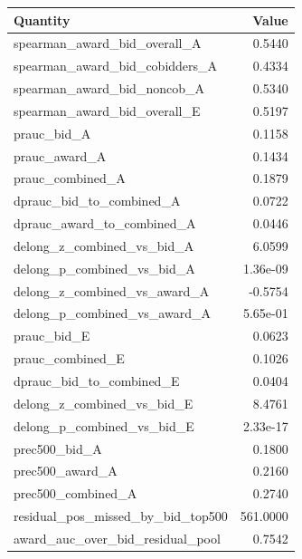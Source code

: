 \begin{tabular}{lr}
\toprule
Quantity & Value \\
\midrule
spearman\_award\_bid\_overall\_A & 0.5440 \\
spearman\_award\_bid\_cobidders\_A & 0.4334 \\
spearman\_award\_bid\_noncob\_A & 0.5340 \\
spearman\_award\_bid\_overall\_E & 0.5197 \\
prauc\_bid\_A & 0.1158 \\
prauc\_award\_A & 0.1434 \\
prauc\_combined\_A & 0.1879 \\
dprauc\_bid\_to\_combined\_A & 0.0722 \\
dprauc\_award\_to\_combined\_A & 0.0446 \\
delong\_z\_combined\_vs\_bid\_A & 6.0599 \\
delong\_p\_combined\_vs\_bid\_A & 1.36e-09 \\
delong\_z\_combined\_vs\_award\_A & -0.5754 \\
delong\_p\_combined\_vs\_award\_A & 5.65e-01 \\
prauc\_bid\_E & 0.0623 \\
prauc\_combined\_E & 0.1026 \\
dprauc\_bid\_to\_combined\_E & 0.0404 \\
delong\_z\_combined\_vs\_bid\_E & 8.4761 \\
delong\_p\_combined\_vs\_bid\_E & 2.33e-17 \\
prec500\_bid\_A & 0.1800 \\
prec500\_award\_A & 0.2160 \\
prec500\_combined\_A & 0.2740 \\
residual\_pos\_missed\_by\_bid\_top500 & 561.0000 \\
award\_auc\_over\_bid\_residual\_pool & 0.7542 \\
\bottomrule
\end{tabular}
